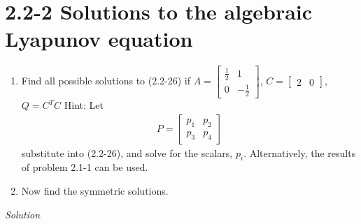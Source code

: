 \documentclass{article}
\begin{document}
  \section{2.2-2 Solutions to the algebraic Lyapunov equation}
  \begin{enumerate}[label=(\alph*)]
	  \item Find all possible solutions to (2.2-26) if \newline
                $A=\begin{bmatrix}
			\frac{1}{2} & 1 \\
			0 & -\frac{1}{2}
  \end{bmatrix}$, $C=\begin{bmatrix}
			2 & 0
  \end{bmatrix}$, $Q=C^TC$ \newline
		  Hint: Let
		  \begin{align*}
			  P=\begin{bmatrix}
			p_1 & p_2 \\
			p_3 & p_4
  \end{bmatrix}
		  \end{align*}
		  substitute into (2.2-26), and solve for the scalars, $p_i$. Alternatively, the results of problem 2.1-1 can be used.
    \item Now find the symmetric solutions. 
  \end{enumerate}

  \noindent \textit{Solution} \newline \newline
\end{document}
